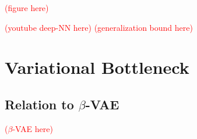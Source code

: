 \documentclass[11pt]{article}
\newcommand\myworries[1]{\textcolor{red}{(#1)}}
\begin{document}
\myworries{figure here}



\myworries{youtube deep-NN here}
\myworries{generalization bound here}

\section{Variational Bottleneck}

\subsection*{Relation to $\beta$-VAE}


\myworries{$\beta$-VAE here}


 
\end{document}
